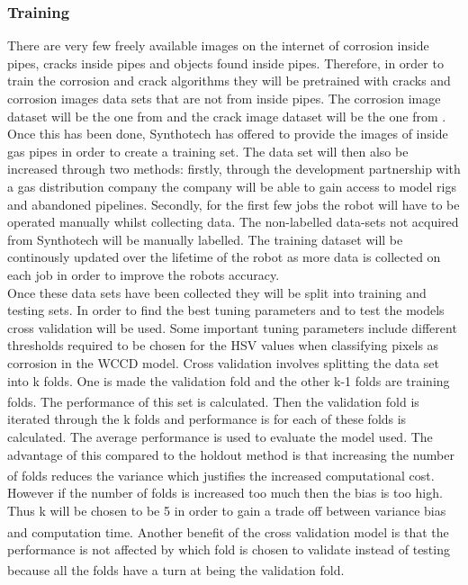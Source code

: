\documentclass[11pt]{article}		%
\newcommand{\supercite}[1]{\textsuperscript{\cite{#1}}}		%
\begin{document}
        \subsubsection{Training}
	        There are very few freely available images on the internet of corrosion inside pipes, cracks inside pipes and objects found inside pipes. Therefore, in order to train the corrosion and crack algorithms they will be pretrained with cracks and corrosion images data sets that are not from inside pipes. The corrosion image dataset will be the one from \cite{WCCD} and the crack image dataset will be the one from \cite{CrackGAN1}.
	        \\
	        Once this has been done, Synthotech has offered to provide the images of inside gas pipes in order to create a training set. The data set will then also be increased through two methods: firstly, through the development partnership with a gas distribution company the company will be able to gain access to model rigs and abandoned pipelines. Secondly, for the first few jobs the robot will have to be operated manually whilst collecting data. The non-labelled data-sets not acquired from Synthotech will be manually labelled. The training dataset will be continously updated over the lifetime of the robot as more data is collected on each job in order to improve the robots accuracy.
	        \\
	        Once these data sets have been collected they will be split into training and testing sets. In order to find the best tuning parameters and to test the models cross validation will be used. Some important tuning parameters include different thresholds required to be chosen for the HSV values when classifying pixels as corrosion in the WCCD model. Cross validation involves splitting the data set into k folds. One is made the validation fold and the other k-1 folds are training folds.\supercite{Cross_Validation} The performance of this set is calculated. Then the validation fold is iterated through the k folds and performance is for each of these folds is calculated. The average performance is used to evaluate the model used. The advantage of this compared to the holdout method is that increasing the number of folds reduces the variance which justifies the increased computational cost.\supercite{Cross_Validation}\supercite{Cross_Validation2} However if the number of folds is increased too much then the bias is too high. Thus k will be chosen to be 5 in order to gain a trade off between variance bias and computation time.\supercite{Cross_Validation_Tradeoff} Another benefit of the cross validation model is that the performance is not affected by which fold is chosen to validate instead of testing because all the folds have a turn at being the validation fold. \supercite{Cross_Validation}
	        
\end{document}
